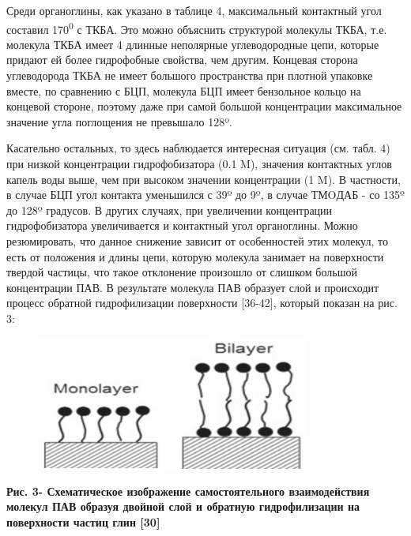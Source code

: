 Среди органоглины, как указано в таблице 4, максимальный контактный угол
составил 170\textsuperscript{0} с ТКБА. Это можно объяснить структурой
молекулы ТКБА, т.е. молекула ТКБА имеет 4 длинные неполярные
углеводородные цепи, которые придают ей более гидрофобные свойства, чем
другим. Концевая сторона углеводорода ТКБА не имеет большого
пространства при плотной упаковке вместе, по сравнению с БЦП, молекула
БЦП имеет бензольное кольцо на концевой стороне, поэтому даже при самой
большой концентрации максимальное значение угла поглощения не превышало
128º.

Касательно остальных, то здесь наблюдается интересная ситуация (см.
табл. 4) при низкой концентрации гидрофобизатора (0.1 M), значения
контактных углов капель воды выше, чем при высоком значении концентрации
(1 M). В частности, в случае БЦП угол контакта уменьшился с 39º до 9º, в
случае ТМOДАБ - со 135º до 128º градусов. В других случаях, при
увеличении концентрации гидрофобизатора увеличивается и контактный угол
органоглины. Можно резюмировать, что данное снижение зависит от
особенностей этих молекул, то есть от положения и длины цепи, которую
молекула занимает на поверхности твердой частицы, что такое отклонение
произошло от слишком большой концентрации ПАВ. В результате молекула ПАВ
образует слой и происходит процесс обратной гидрофилизации поверхности
{[}36-42{]}, который показан на рис. 3:

\begin{figure}[H]
	\centering
	\includegraphics[width=0.8\textwidth]{assets/1027}
	\caption*{}
\end{figure}

{\bfseries Рис. 3- Схематическое изображение самостоятельного
взаимодействия молекул ПАВ образуя двойной слой и обратную
гидрофилизации на поверхности частиц глин {[}30{]}}

